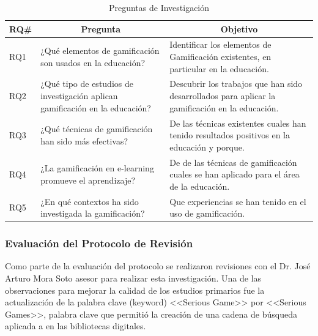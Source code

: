 \documentclass{report}
\begin{document}
            \begin{table}
                \begin{center}
                    \caption{Preguntas de Investigación}
                    \label{table:researchQuestions}
                    \begin{tabular}{| l | p{6cm} | p{6cm} |}
                        \toprule
                        \hline
                        \multicolumn{1}{|c|}{\textbf{RQ\#}} & \multicolumn{1}{|c|}{\textbf{Pregunta}}  & \multicolumn{1}{|c|}{\textbf{Objetivo}} \\
                        \hline
                        RQ1 & ¿Qué elementos de gamificación son usados en la educación? & Identificar los elementos de Gamificación existentes, en particular en la educación. \\
                        \hline
                        RQ2 & ¿Qué tipo de estudios de investigación aplican gamificación en la educación? & Descubrir los trabajos que han sido desarrollados para aplicar la gamificación en la educación. \\
                        \hline
                        RQ3 & ¿Qué técnicas de gamificación han sido más efectivas? & De las técnicas existentes cuales han tenido resultados positivos en la educación y porque. \\
                        \hline
                        RQ4 & ¿La gamificación en e-learning promueve el aprendizaje? & De de las técnicas de gamificación cuales se han aplicado para el área de la educación.\\
                        \hline
                        RQ5 & ¿En qué contextos ha sido investigada la gamificación? & Que experiencias se han tenido en el uso de gamificación.\\
                        \hline
                    \end{tabular}
                \end{center}
            \end{table}
            
            \subsubsection{Evaluación del Protocolo de Revisión}

            Como parte de la evaluación del protocolo se realizaron revisiones con el Dr. José Arturo Mora Soto asesor para realizar esta investigación. Una de las observaciones para mejorar la calidad de los estudios primarios fue la actualización de la palabra clave (keyword) <<Serious Game>> por <<Serious Games>>, palabra clave que permitió la creación de una cadena de búsqueda aplicada a en las bibliotecas digitales. \\
\end{document}

